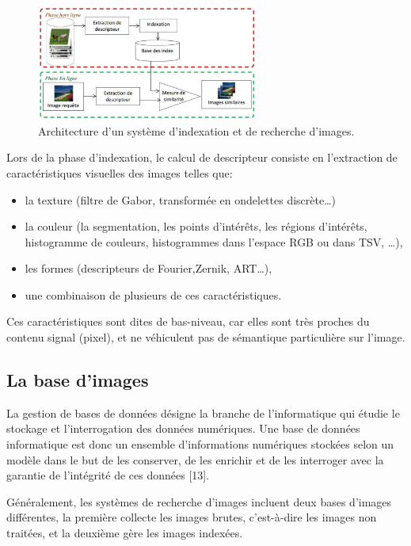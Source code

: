 \begin{figure}[H]
	    \label{fig:cbir_principe}
		\centering
		\includegraphics[width=0.65\textwidth]{Figures/cbir_principe} %
		\caption{ Architecture d'un système d'indexation et de recherche d'images.}
\end{figure}

Lors de la phase d'indexation, le calcul de descripteur consiste en l'extraction de caractéristiques visuelles des images telles que:
\begin{itemize}
	\item la texture (filtre de Gabor, transformée en ondelettes discrète…)
	\item la couleur (la segmentation, les points d’intérêts, les régions d’intérêts,
	histogramme de couleurs, histogrammes dans l'espace RGB ou dans TSV, …),
	\item les formes (descripteurs de Fourier,Zernik, ART…),
	\item une combinaison de plusieurs de ces caractéristiques.
\end{itemize}

Ces caractéristiques sont dites de bas-niveau, car elles sont très proches du contenu signal (pixel), et ne véhiculent pas de sémantique particulière sur l'image.\\


\subsection{La base d’images}
La gestion de bases de données désigne la branche de l’informatique qui étudie le stockage et l’interrogation des données numériques. Une base de données informatique est donc un ensemble d’informations numériques stockées selon un modèle dans le but de les conserver, de les enrichir et de les interroger avec la garantie de l’intégrité de ces données [13].

Généralement, les systèmes de recherche d’images incluent deux bases d’images différentes, la première collecte les images brutes, c’est-à-dire les images non traitées, et la
deuxième gère les images indexées.

